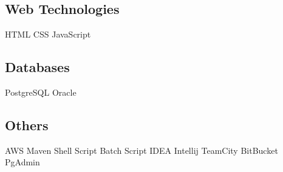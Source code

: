 \documentclass[]{deedy-resume-openfont}
\begin{document}
\begin{minipage}[t]{0.33\textwidth}
\subsection{Web Technologies}
HTML \textbullet{} CSS \textbullet{} JavaScript
\sectionsep
\subsection{Databases}
PostgreSQL \textbullet{} Oracle \textbullet{}
\sectionsep
\subsection{Others}
AWS \textbullet{} Maven \textbullet{} Shell Script \textbullet{} Batch Script \textbullet{} IDEA Intellij \textbullet{} TeamCity\textbullet{} BitBucket \textbullet{} PgAdmin

%
%

\end{minipage} 
\hfill
\end{document}
